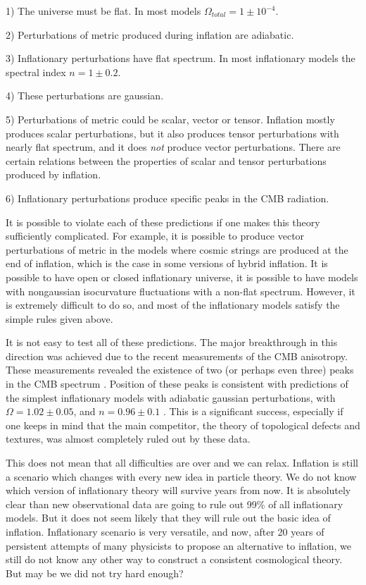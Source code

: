 \documentclass[a4paper,12pt]{article}
\begin{document}
1) The universe must be flat. In most models $\Omega_{total} = 1 \pm 10^{-4}$.

2) Perturbations of metric produced during inflation are adiabatic.  

3) Inflationary perturbations have flat spectrum.  In most inflationary models the spectral index  $n = 1 \pm 0.2$.

4) These perturbations are gaussian.  

5) Perturbations of metric could be scalar, vector or tensor. Inflation mostly produces scalar perturbations, but it also produces tensor perturbations with nearly flat spectrum, and it does {\it not} produce vector perturbations. There are certain relations between the properties of  scalar and tensor perturbations produced by inflation.

6) Inflationary perturbations produce specific peaks in the CMB radiation.

It is possible to violate each of these predictions if one makes this theory sufficiently complicated. For example, it is possible to produce vector perturbations of metric in the models where  cosmic strings are produced at the end of inflation, which is the case in some versions of hybrid inflation. It is possible to have open or closed inflationary universe, it is possible to have models with nongaussian isocurvature fluctuations with a non-flat spectrum. However, it is extremely difficult to do so, and most of the inflationary models satisfy the simple rules given above.  

It is not easy to test all of these predictions. The major breakthrough in this direction was achieved due to the recent measurements of the CMB anisotropy. These measurements revealed the existence of two (or perhaps even three) peaks in the CMB spectrum \cite{CMB}. Position of these peaks is consistent with predictions of the simplest inflationary models with adiabatic gaussian perturbations, with $\Omega = 1.02 \pm 0.05$, and $n = 0.96 \pm 0.1$ \cite{Lang}. This is a significant success, especially if one keeps in mind that the main competitor, the theory of topological defects and textures, was almost completely ruled out by these data.


 
This does not mean that all
difficulties are over and we can relax. Inflation is still
a scenario which changes with every new idea in particle theory. 
We do not know which version of inflationary theory will survive
years from now. It is absolutely clear than new observational data are
going to rule out 99\% of all inflationary models. But it does not seem
likely that they will rule out the basic idea of inflation. Inflationary
scenario is very versatile, and now, after 20 years of persistent
attempts of many physicists to propose an alternative to inflation, we
still do not know any other  way to construct a consistent cosmological
theory.  But may be we  did not try hard enough? 
\end{document}
